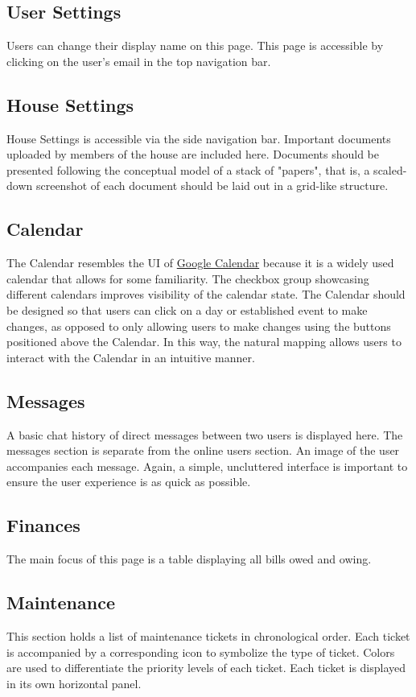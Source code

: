 \documentclass[12pt]{article}
\begin{document}
\subsection{User Settings}
Users can change their display name on this page. This page is accessible by clicking on the user's email in the top navigation bar.

\subsection{House Settings}
House Settings is accessible via the side navigation bar. Important documents uploaded by members of the house are included here. Documents should be presented following the conceptual model of a stack of "papers", that is, a scaled-down screenshot of each document should be laid out in a grid-like structure. 

\subsection{Calendar}
The Calendar resembles the UI of \href{https://apps.google.com/products/calendar/‎}{Google Calendar} because it is a widely used calendar that allows for some familiarity. The checkbox group showcasing different calendars improves visibility of the calendar state. The Calendar should be designed so that users can click on a day or established event to make changes, as opposed to only allowing users to make changes using the buttons positioned above the Calendar. In this way, the natural mapping allows users to interact with the Calendar in an intuitive manner.

\subsection{Messages}
A basic chat history of direct messages between two users is displayed here. The messages section is separate from the online users section. An image of the user accompanies each message. Again, a simple, uncluttered interface is important to ensure the user experience is as quick as possible.

\subsection{Finances}
The main focus of this page is a table displaying all bills owed and owing.

\subsection{Maintenance}
This section holds a list of maintenance tickets in chronological order. Each ticket is accompanied by a corresponding icon to symbolize the type of ticket. Colors are used to differentiate the priority levels of each ticket. Each ticket is displayed in its own horizontal panel.
\end{document}
